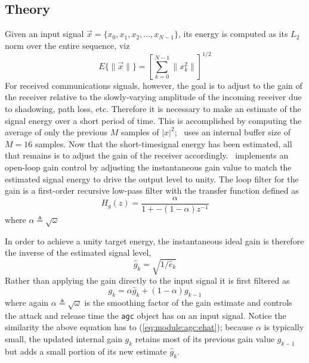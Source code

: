 \subsection{Theory}
\label{module:agc:theory}
Given an input signal
$\vec{x} = \{ x_0, x_1, x_2, \ldots, x_{N-1} \}$,
its energy is computed as its $L_2$ norm over the entire sequence, viz
\begin{equation}
\label{eqn:agc:energy}
    E\{ \|\vec{x}\| \} = 
        \left[
            \sum\limits_{k=0}^{N-1} {\|x_k^2\|}
        \right]^{1/2}
\end{equation}
For received communications signals, however, the goal is to adjust to the
gain of the receiver relative to the slowly-varying amplitude of the incoming
receiver due to shadowing, path loss, etc.
Therefore it is necessary to make an estimate of the signal energy over
a short period of time.
This is accomplished by computing the average of only the previous $M$
samples of $|x|^2$; \liquid\ uses an internal buffer size of $M=16$
samples.
Now that the short-timesignal energy has been estimated, all that remains is to
adjust the gain of the receiver accordingly.
\liquid\ implements an open-loop gain control by adjusting the
instantaneous gain value to match the estimated signal energy to drive
the output level to unity.
The loop filter for the gain is a first-order recursive low-pass filter
with the transfer function defined as
%
\begin{equation}
\label{eqn:agc:loop_filter}
    H_g(z) =
        \frac{
            \alpha
        }{
            1 + -(1-\alpha) z^{-1}
        }
\end{equation}
%
where $\alpha \triangleq \sqrt{\omega}$
%

In order to achieve a unity target energy, the instantaneous ideal gain is
therefore the inverse of the estimated signal level,
%
\begin{equation}
\label{eqn:agc:default:ghat}
    \hat{g}_{k} = \sqrt{1 / \hat{e}_k}
\end{equation}
%
Rather than applying the gain directly to the input signal it is first
filtered as
%
\begin{equation}
\label{eqn:agc:default:g}
    g_{k} = \alpha \hat{g}_{k} + (1-\alpha) g_{k-1}
\end{equation}
%
where again $\alpha \triangleq \sqrt{\omega}$ is the smoothing factor of
the gain estimate and controls the attack and release time the {\tt agc}
object has on an input signal.
Notice the similarity the above equation has to
(\ref{eq:module:agc:ehat});
because $\alpha$ is typically small, the updated internal gain $g_{k}$
retains most of its previous gain value $g_{k-1}$ but adds a small
portion of its new estimate $\hat{g}_{k}$.


